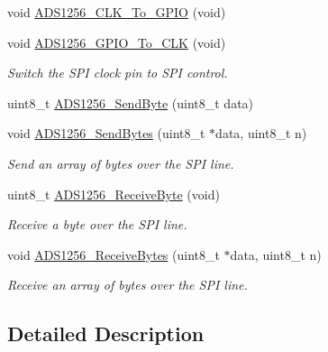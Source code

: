 \begin{DoxyCompactItemize}
\item 
void \hyperlink{group__ads1256__driver_ga3a68db63bde582e77d1cad0e86e07922}{A\-D\-S1256\-\_\-\-C\-L\-K\-\_\-\-To\-\_\-\-G\-P\-I\-O} (void)
\item 
void \hyperlink{group__ads1256__driver_ga631498cd1b9e0302c8ceec6ad3094e03}{A\-D\-S1256\-\_\-\-G\-P\-I\-O\-\_\-\-To\-\_\-\-C\-L\-K} (void)
\begin{DoxyCompactList}\small\item\em Switch the S\-P\-I clock pin to S\-P\-I control. \end{DoxyCompactList}\item 
uint8\-\_\-t \hyperlink{group__ads1256__driver_ga81371e39460504d1badd6291ef5ba2f7}{A\-D\-S1256\-\_\-\-Send\-Byte} (uint8\-\_\-t data)
\item 
void \hyperlink{group__ads1256__driver_ga0eecf15939442deb9f23a1f9758539f9}{A\-D\-S1256\-\_\-\-Send\-Bytes} (uint8\-\_\-t $\ast$data, uint8\-\_\-t n)
\begin{DoxyCompactList}\small\item\em Send an array of bytes over the S\-P\-I line. \end{DoxyCompactList}\item 
uint8\-\_\-t \hyperlink{group__ads1256__driver_gaaf7d951b7d407997f2c6bee84932c883}{A\-D\-S1256\-\_\-\-Receive\-Byte} (void)
\begin{DoxyCompactList}\small\item\em Receive a byte over the S\-P\-I line. \end{DoxyCompactList}\item 
void \hyperlink{group__ads1256__driver_gadadfc4d298fad4e9833975340b7eeaae}{A\-D\-S1256\-\_\-\-Receive\-Bytes} (uint8\-\_\-t $\ast$data, uint8\-\_\-t n)
\begin{DoxyCompactList}\small\item\em Receive an array of bytes over the S\-P\-I line. \end{DoxyCompactList}\end{DoxyCompactItemize}


\subsection{Detailed Description}


